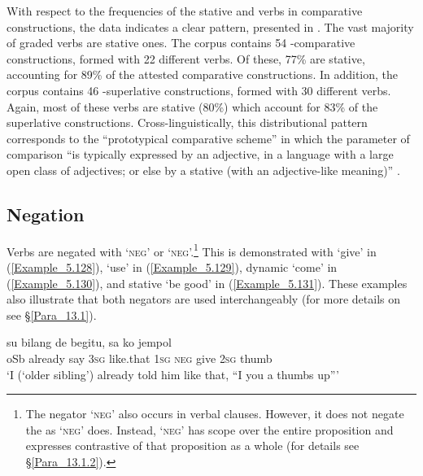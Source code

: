 With respect to the frequencies of the  stative and  verbs in comparative constructions, the data indicates a clear pattern, presented in . The vast majority of graded verbs are  stative ones. The corpus contains 54 -comparative constructions, formed with 22 different verbs. Of these, 77\% are  stative, accounting for 89\% of the attested comparative constructions. In addition, the corpus contains 46 -superlative constructions, formed with 30 different verbs. Again, most of these verbs are  stative (80\%) which account for 83\% of the superlative constructions. Cross-linguistically, this distributional pattern corresponds to the “prototypical comparative scheme” in which the parameter of comparison “is typically expressed by an adjective, in a language with a large open class of adjectives; or else by a stative  (with an adjective-like meaning)” {\citep[787]{Dixon.2008}}.


\subsection{Negation}
\label{Para_5.3.6}
Verbs are negated with  ‘\textsc{neg}’ or  ‘\textsc{neg}’.\footnote{\label{Footnote_5.155}The negator  ‘\textsc{neg}’ also occurs in verbal clauses. However, it does not negate the  as  ‘\textsc{neg}’ does. Instead,  ‘\textsc{neg}’ has scope over the entire proposition and expresses contrastive  of that proposition as a whole (for details see §\ref{Para_13.1.2}).} This is demonstrated with   ‘give’ in (\ref{Example_5.128}),   ‘use’ in (\ref{Example_5.129}),  dynamic  ‘come’ in (\ref{Example_5.130}), and  stative  ‘be good’ in (\ref{Example_5.131}). These examples also illustrate that both negators are used interchangeably (for more details on  see §\ref{Para_13.1}).


\ea
\label{Example_5.128}
 {su} {bilang} {de} {begitu,} {sa} {} {} {ko} {jempol}\\ %
 oSb  already  say  \textsc{3sg}  like.that  \textsc{1sg}  \textsc{neg}  give  \textsc{2sg}  thumb\\
\glt 
‘I (‘older sibling’) already told him like that, ``I  you a thumbs up''' \textstyleExampleSource{[081115-001a-Cv.0042]}
\z

